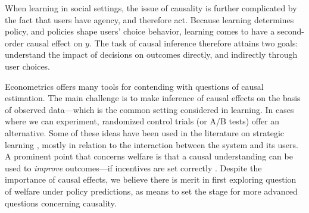 When learning in social settings, the issue of causality is further complicated 
by the fact that users have agency, and therefore act.
Because learning determines policy, and policies shape users' choice behavior,
learning comes to have a second-order causal effect on $y$.
The task of causal inference therefore attains two goals:
understand the impact of decisions on outcomes directly,
and indirectly through user choices.

Econometrics offers many tools for contending with questions of 
causal estimation.
The main challenge is to make inference of causal effects on the basis of observed data---which is the common setting considered in learning.
In cases where we can experiment, randomized control trials (or A/B tests)
offer an alternative.
Some of these ideas have been used in the literature on strategic learning
\citep{miller2020strategic,shavit2020causal,horowitz2023causal},
mostly in relation to the interaction between the system and its users.
A prominent point that concerns welfare is that a causal understanding can be used
to \emph{improve} outcomes---if incentives are set correctly
\citep{kleinberg2020classifiers}.
Despite the importance of causal effects,
we believe there is merit in first exploring question of welfare
under policy predictions, as means to set the stage for more advanced questions concerning causality.






